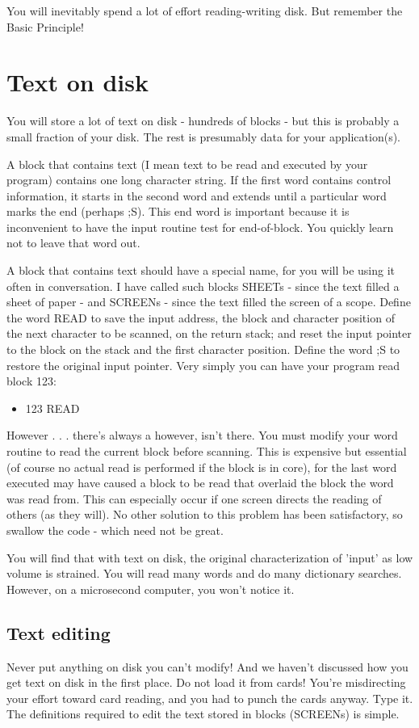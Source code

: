 \documentclass[b5paper, oneside]{book}
\begin{document}
You will inevitably spend a lot of effort reading-writing disk. But remember the Basic Principle!

\section{Text on disk}
You will store a lot of text on disk - hundreds of blocks - but this is probably a small fraction of your disk. The rest is presumably data for your application(s).

A block that contains text (I mean text to be read and executed by your program) contains one long character string. If the first word contains control information, it starts in the second word and extends until a particular word marks the end (perhaps ;S). This end word is important because it is inconvenient to have the input routine test for end-of-block. You quickly learn not to leave that word out.

A block that contains text should have a special name, for you will be using it often in conversation. I have called such blocks SHEETs - since the text filled a sheet of paper - and SCREENs - since the text filled the screen of a scope. Define the word READ to save the input address, the block and character position of the next character to be scanned, on the return stack; and reset the input pointer to the block on the stack and the first character position. Define the word ;S to restore the original input pointer. Very simply you can have your program read block 123:\begin{itemize}
   \item 123 READ\end{itemize}
However . . . there's always a however, isn't there. You must modify your word routine to read the current block before scanning. This is expensive but essential (of course no actual read is performed if the block is in core), for the last word executed may have caused a block to be read that overlaid the block the word was read from. This can especially occur if one screen directs the reading of others (as they will). No other solution to this problem has been satisfactory, so swallow the code - which need not be great.

You will find that with text on disk, the original characterization of 'input' as low volume is strained. You will read many words and do many dictionary searches. However, on a microsecond computer, you won't notice it.

\subsection{Text editing}
Never put anything on disk you can't modify! And we haven't discussed how you get text on disk in the first place. Do not load it from cards! You're misdirecting your effort toward card reading, and you had to punch the cards anyway. Type it. The definitions required to edit the text stored in blocks (SCREENs) is simple.
\end{document}
